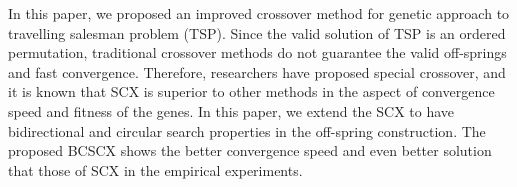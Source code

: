 In this paper, we proposed an improved crossover method for genetic approach to travelling salesman problem (TSP). Since the valid solution of TSP is an ordered permutation, traditional crossover methods do not guarantee the valid off-springs and fast convergence. Therefore, researchers have proposed special crossover, and it is known that SCX is superior to other methods in the aspect of convergence speed and fitness of the genes. In this paper, we extend the SCX to have bidirectional and circular search properties in the off-spring construction. The proposed BCSCX shows the better convergence speed and even better solution that those of SCX in the empirical experiments.